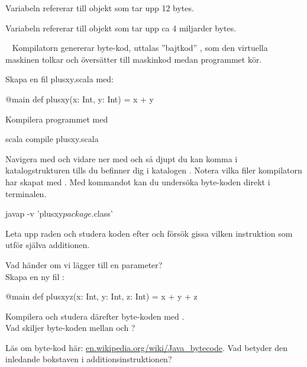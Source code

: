 \SubtaskSolved Variabeln  refererar till objekt som tar upp 12 bytes.

\SubtaskSolved Variabeln  refererar till objekt som tar upp ca 4 miljarder bytes.

\QUESTEND





\QUESTBEGIN

\Task\Uberkurs  \what~  Kompilatorn genererar byte-kod, uttalas ''bajtkod'' , som den virtuella maskinen tolkar och översätter till maskinkod medan programmet kör. 

Skapa en fil plusxy.scala med:
\begin{Code}
@main def plusxy(x: Int, y: Int) = x + y
\end{Code}
Kompilera programmet med 
\begin{REPLnonum}
scala compile plusxy.scala
\end{REPLnonum} 
Navigera med  och vidare ner med  och  så djupt du kan komma i katalogstrukturen tills du befinner dig i katalogen . Notera vilka filer kompilatorn har skapat med . Med kommandot  kan du undersöka byte-koden direkt i terminalen.
\begin{REPL}
javap -v 'plusxy$package$.class'
\end{REPL}

\Subtask Leta upp raden  och studera koden efter  och försök gissa vilken instruktion som utför själva additionen.

\Subtask Vad händer om vi lägger till en parameter? \\ 
Skapa en ny fil :
\begin{Code}
@main def plusxyz(x: Int, y: Int, z: Int) = x + y + z
\end{Code}
Kompilera och studera därefter byte-koden med . \\ Vad skiljer byte-koden mellan  och ?

\Subtask Läs om byte-kod här: \href{https://en.wikipedia.org/wiki/Java\_bytecode}{en.wikipedia.org/wiki/Java\_bytecode}. Vad betyder den inledande bokstaven i additionsinstruktionen?


\SOLUTION

\TaskSolved \what~

